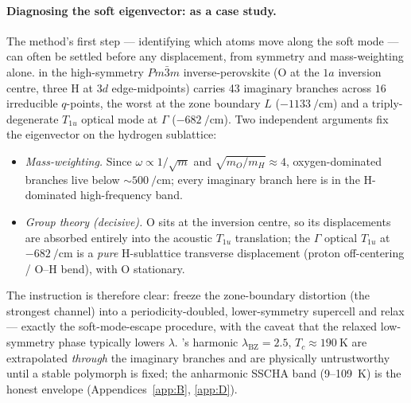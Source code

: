\paragraph{Diagnosing the soft eigenvector:  as a case study.}
The method's first step --- identifying which atoms move along the soft mode
--- can often be settled before any displacement, from symmetry and
mass-weighting alone.  in the high-symmetry $Pm\bar{3}m$
inverse-perovskite (O at the $1a$ inversion centre, three H at $3d$
edge-midpoints) carries 43 imaginary branches across $16$ irreducible
$q$-points, the worst at the zone boundary $L$ ($-\SI{1133}{\per\centi\meter}$)
and a triply-degenerate $T_{1u}$ optical mode at $\Gamma$
($-\SI{682}{\per\centi\meter}$). Two independent arguments fix the
eigenvector on the hydrogen sublattice:
\begin{itemize}\itemsep0.2em
\item \emph{Mass-weighting.} Since $\omega\propto1/\sqrt{m}$ and
  $\sqrt{m_O/m_H}\approx4$, oxygen-dominated branches live below
  $\sim\SI{500}{\per\centi\meter}$; every imaginary branch here is in the
  H-dominated high-frequency band.
\item \emph{Group theory (decisive).} O sits at the inversion centre, so its
  displacements are absorbed entirely into the acoustic $T_{1u}$ translation;
  the $\Gamma$ optical $T_{1u}$ at $-\SI{682}{\per\centi\meter}$ is a
  \emph{pure} H-sublattice transverse displacement (proton off-centering /
  O--H bend), with O stationary.
\end{itemize}
The instruction is therefore clear: freeze the zone-boundary distortion (the
strongest channel) into a periodicity-doubled, lower-symmetry supercell and
relax --- exactly the soft-mode-escape procedure, with the caveat that the
relaxed low-symmetry phase typically lowers $\lambda$. 's harmonic
$\lambda_{\mathrm{BZ}}=2.5$, $T_c\approx\SI{190}{\kelvin}$ are extrapolated
\emph{through} the imaginary branches and are physically untrustworthy until
a stable polymorph is fixed; the anharmonic SSCHA band (9--\SI{109}{\kelvin})
is the honest envelope (Appendices~\ref{app:B}, \ref{app:D}).

